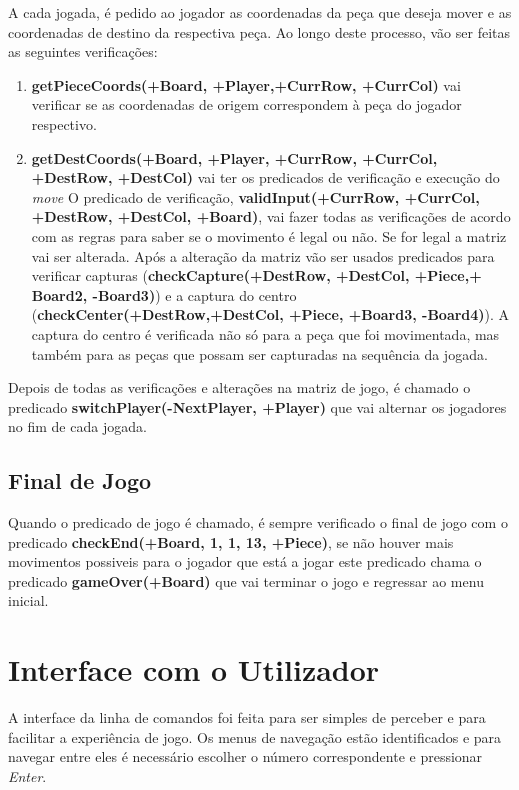 \documentclass[a4paper]{article}
\begin{document}
\par A cada jogada, é pedido ao jogador as coordenadas da peça que deseja mover e as coordenadas de destino da respectiva peça. Ao longo deste processo, vão ser feitas as seguintes verificações: 
\begin{enumerate}
	\item \textbf{getPieceCoords(+Board, +Player,+CurrRow, +CurrCol)} vai verificar se as coordenadas de origem correspondem à peça do jogador respectivo. 
	\item \textbf{getDestCoords(+Board, +Player, +CurrRow, +CurrCol, +DestRow, +DestCol)} vai ter os predicados de verificação e execução do \textit{move}
	\subitem O predicado de verificação, \textbf{validInput(+CurrRow, +CurrCol, +DestRow, +DestCol, +Board)}, vai fazer todas as verificações de acordo com as regras para saber se o movimento é legal ou não. Se for legal a matriz vai ser alterada. 
	\subitem Após a alteração da matriz vão ser usados predicados para verificar capturas (\textbf{checkCapture(+DestRow, +DestCol, +Piece,+ Board2, -Board3)}) e a captura do centro (\textbf{checkCenter(+DestRow,+DestCol, \linebreak +Piece, +Board3, -Board4)}). A captura do centro é verificada não só para a peça que foi movimentada, mas também para as peças que possam ser capturadas na sequência da jogada. 
\end{enumerate}

Depois de todas as verificações e alterações na matriz de jogo, é chamado o predicado \textbf{switchPlayer(-NextPlayer, +Player)} que vai alternar os jogadores no fim de cada jogada.

\subsection{Final de Jogo}
Quando o predicado de jogo é chamado, é sempre verificado o final de jogo com o predicado \textbf{checkEnd(+Board, 1, 1, 13, +Piece)}, se não houver mais movimentos possiveis para o jogador que está a jogar este predicado chama o predicado \textbf{gameOver(+Board)} que vai terminar o jogo e regressar ao menu inicial.

\newpage
\section{Interface com o Utilizador}

A interface da linha de comandos foi feita para ser simples de perceber e para facilitar a experiência de jogo. Os menus de navegação estão identificados e para navegar entre eles é necessário escolher o número correspondente e pressionar \textit{Enter}. 
\end{document}
